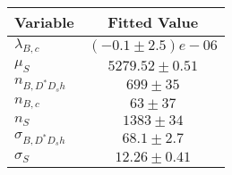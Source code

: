 \begin{tabular}[t]{lc}
\hline
Variable &Fitted Value\\
\hline\hline
$\lambda_{B,c}$&$(-0.1\pm2.5)e-06$\\
\hline
$\mu_S$&$5279.52\pm0.51$\\
\hline
$n_{B, D^* D_s h}$&$699\pm35$\\
\hline
$n_{B,c}$&$63\pm37$\\
\hline
$n_S$&$1383\pm34$\\
\hline
$\sigma_{B, D^* D_s h}$&$68.1\pm2.7$\\
\hline
$\sigma_S$&$12.26\pm0.41$\\
\hline
\end{tabular}
